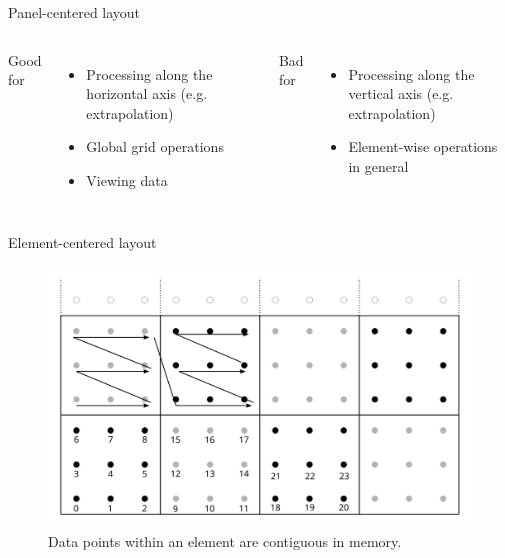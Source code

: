 \documentclass{beamer}
\begin{document}
\begin{frame}{Panel-centered layout}
\begin{columns}
Good for
    \begin{itemize}
        \item Processing along the horizontal axis (e.g. extrapolation)
        \item Global grid operations
        \item Viewing data
    \end{itemize}

Bad for
    \begin{itemize}
        \item Processing along the vertical axis (e.g. extrapolation)
        \item Element-wise operations in general
    \end{itemize}
\end{columns}
\end{frame}

\begin{frame}{Element-centered layout}
\begin{figure}
    \includegraphics[scale=0.7]{img/elem_wise_layout}
    \caption{Data points within an element are contiguous in memory.}
\end{figure}
\end{frame}
\end{document}
